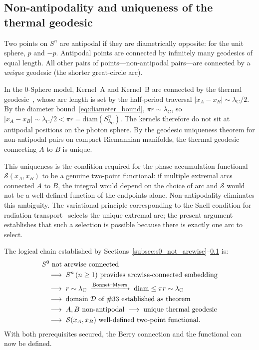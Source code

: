 \documentclass[%
 reprint, amsmath,amssymb, aps, prb, ]{revtex4-2}
\numberwithin{equation}{section}
\newcommand{\lambdaC}{\lambda_{\mathrm{C}}}
\begin{document}
\subsection{Non-antipodality and uniqueness of the thermal geodesic}
\label{subsec:non_antipodal}

Two points on $S^n$ are antipodal if they are diametrically opposite: for the unit sphere, $p$ and $-p$. Antipodal points are connected by infinitely many geodesics of equal length. All other pairs of points---non-antipodal pairs---are connected by a \emph{unique} geodesic (the shorter great-circle arc).

In the 0-Sphere model, Kernel~A and Kernel~B are connected by the thermal geodesic~\cite{hanamura24}, whose arc length is set by the half-period traversal $|x_A - x_B|\sim\lambdaC/2$. By the diameter bound~\eqref{eq:diameter_bound}, $\pi r\sim\lambdaC$, so $|x_A - x_B|\sim\lambdaC/2 < \pi r = \mathrm{diam}(S^n_{\lambdaC})$. The kernels therefore do not sit at antipodal positions on the photon sphere. By the geodesic uniqueness theorem for non-antipodal pairs on compact Riemannian manifolds, the thermal geodesic connecting $A$ to $B$ is unique.

This uniqueness is the condition required for the phase accumulation functional $\mathcal{S}(x_A,x_B)$ to be a genuine two-point functional: if multiple extremal arcs connected $A$ to $B$, the integral would depend on the choice of arc and $\mathcal{S}$ would not be a well-defined function of the endpoints alone. Non-antipodality eliminates this ambiguity. The variational principle corresponding to the Snell condition for radiation transport~\cite{hanamura24} selects the unique extremal arc; the present argument establishes that such a selection is possible because there is exactly one arc to select.

The logical chain established by Sections~\ref{subsec:s0_not_arcwise}--\ref{subsec:non_antipodal} is:
\begin{align}
&S^0 \text{ not arcwise connected}
\notag\\
&\quad\longrightarrow\; S^n\,(n\geq 1) \text{ provides arcwise-connected embedding}
\notag\\
&\quad\longrightarrow\; r\sim\lambdaC \;\xrightarrow{\text{Bonnet--Myers}}\; \mathrm{diam}\leq\pi r\sim\lambdaC
\notag\\
&\quad\longrightarrow\; \text{domain }\mathcal{D}\text{ of \#33 established as theorem}
\notag\\
&\quad\longrightarrow\; A,B\text{ non-antipodal}\;\longrightarrow\;\text{unique thermal geodesic}
\notag\\
&\quad\longrightarrow\; \mathcal{S}(x_A,x_B)\text{ well-defined two-point functional.}
\label{eq:arcwise_chain}
\end{align}
With both prerequisites secured, the Berry connection and the functional can now be defined.
\end{document}
